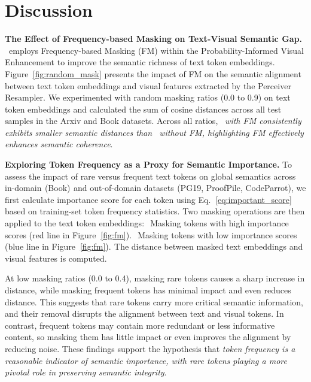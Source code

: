 \section{Discussion}

\noindent\textbf{The Effect of Frequency-based Masking on Text-Visual Semantic Gap.}
\ourname\ employs Frequency-based Masking (FM) within the Probability-Informed Visual Enhancement to improve the semantic richness of text token embeddings.
Figure~\ref{fig:random_mask} presents the impact of FM on the semantic alignment between text token embeddings and visual features extracted by the Perceiver Resampler. 
We experimented with random masking ratios (0.0 to 0.9) on text token embeddings and calculated the sum of cosine distances across all test samples in the Arxiv and Book datasets. 
Across all ratios, \textit{\ourname\ with FM consistently exhibits smaller semantic distances than \ourname\ without FM, highlighting FM effectively enhances semantic coherence}.

\noindent\textbf{Exploring Token Frequency as a Proxy for Semantic Importance.}
To assess the impact of rare versus frequent text tokens on global semantics across in-domain$_{\!}$ (Book) $_{\!}$and out-of-domain datasets$_{\!}$ (PG19, ProofPile, CodeParrot), we first calculate importance score for each token using Eq.$_{\!}$~\ref{eq:important_score} based on training-set token frequency statistics. Two masking operations are then applied to the text token embeddings: $_{\!}$ Masking tokens with high importance scores (red line in Figure$_{\!}$~\ref{fig:fm}). $_{\!}$ Masking tokens with low importance scores (blue line in Figure$_{\!}$~\ref{fig:fm}). $_{\!}$The distance between masked text embeddings and visual features is computed.


At low masking ratios (0.0 to 0.4), masking rare tokens causes a sharp increase in distance, while masking frequent tokens has minimal impact and even reduces distance. This suggests that rare tokens carry more critical semantic information, and their removal disrupts the alignment between text and visual tokens. In contrast, frequent tokens may contain more redundant or less informative content, so masking them has little impact or even improves the alignment by reducing noise. 
These findings support the hypothesis that \textit{token frequency is a reasonable indicator of semantic importance, with rare tokens playing a more pivotal role in preserving semantic integrity}.
